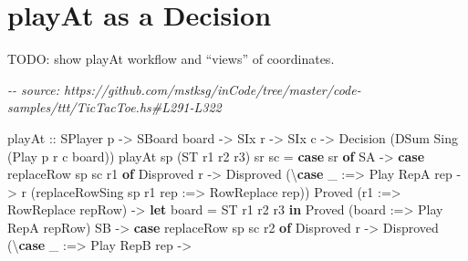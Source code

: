 \documentclass[]{article}
\newenvironment{Shaded}{}{}
\newcommand{\CommentTok}[1]{\textcolor[rgb]{0.38,0.63,0.69}{\textit{#1}}}
\newcommand{\DataTypeTok}[1]{\textcolor[rgb]{0.56,0.13,0.00}{#1}}
\newcommand{\KeywordTok}[1]{\textcolor[rgb]{0.00,0.44,0.13}{\textbf{#1}}}
\newcommand{\NormalTok}[1]{#1}
\newcommand{\OperatorTok}[1]{\textcolor[rgb]{0.40,0.40,0.40}{#1}}
\newcommand{\OtherTok}[1]{\textcolor[rgb]{0.00,0.44,0.13}{#1}}
\begin{document}
\section{playAt as a Decision}\label{playat-as-a-decision}

TODO: show playAt workflow and ``views'' of coordinates.

\begin{Shaded}
\begin{Highlighting}[]
\CommentTok{{-}{-} source: https://github.com/mstksg/inCode/tree/master/code{-}samples/ttt/TicTacToe.hs\#L291{-}L322}

\NormalTok{playAt}
\OtherTok{    ::} \DataTypeTok{SPlayer}\NormalTok{ p}
    \OtherTok{{-}\textgreater{}} \DataTypeTok{SBoard}\NormalTok{ board}
    \OtherTok{{-}\textgreater{}} \DataTypeTok{SIx}\NormalTok{ r}
    \OtherTok{{-}\textgreater{}} \DataTypeTok{SIx}\NormalTok{ c}
    \OtherTok{{-}\textgreater{}} \DataTypeTok{Decision}\NormalTok{ (}\DataTypeTok{DSum} \DataTypeTok{Sing}\NormalTok{ (}\DataTypeTok{Play}\NormalTok{ p r c board))}
\NormalTok{playAt sp (}\DataTypeTok{ST}\NormalTok{ r1 r2 r3) sr sc }\OtherTok{=}
    \KeywordTok{case}\NormalTok{ sr }\KeywordTok{of}
        \DataTypeTok{SA} \OtherTok{{-}\textgreater{}}
            \KeywordTok{case}\NormalTok{ replaceRow sp sc r1 }\KeywordTok{of}
                \DataTypeTok{Disproved}\NormalTok{ r }\OtherTok{{-}\textgreater{}} \DataTypeTok{Disproved}\NormalTok{ (\textbackslash{}}\KeywordTok{case}
\NormalTok{                    \_ }\OperatorTok{:=\textgreater{}} \DataTypeTok{Play} \DataTypeTok{RepA}\NormalTok{ rep }\OtherTok{{-}\textgreater{}}
\NormalTok{                        r (replaceRowSing sp r1 rep }\OperatorTok{:=\textgreater{}} \DataTypeTok{RowReplace}\NormalTok{ rep))}
                \DataTypeTok{Proved}\NormalTok{ (r1\textquotesingle{} }\OperatorTok{:=\textgreater{}} \DataTypeTok{RowReplace}\NormalTok{ repRow) }\OtherTok{{-}\textgreater{}}
                    \KeywordTok{let}\NormalTok{ board\textquotesingle{} }\OtherTok{=} \DataTypeTok{ST}\NormalTok{ r1\textquotesingle{} r2 r3}
                    \KeywordTok{in} \DataTypeTok{Proved}\NormalTok{ (board\textquotesingle{} }\OperatorTok{:=\textgreater{}} \DataTypeTok{Play} \DataTypeTok{RepA}\NormalTok{ repRow)}
        \DataTypeTok{SB} \OtherTok{{-}\textgreater{}}
            \KeywordTok{case}\NormalTok{ replaceRow sp sc r2 }\KeywordTok{of}
                \DataTypeTok{Disproved}\NormalTok{ r }\OtherTok{{-}\textgreater{}} \DataTypeTok{Disproved}\NormalTok{ (\textbackslash{}}\KeywordTok{case}
\NormalTok{                    \_ }\OperatorTok{:=\textgreater{}} \DataTypeTok{Play} \DataTypeTok{RepB}\NormalTok{ rep }\OtherTok{{-}\textgreater{}}

\end{Highlighting}
\end{Shaded}
\end{document}
